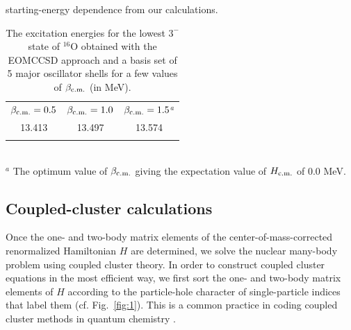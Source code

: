 \documentclass[epj]{svjour}
\begin{document}
starting-energy dependence from our calculations.
%
\begin{table}
\caption{The excitation energies for
the lowest $3^{-}$ state of $^{16}$O obtained with
the EOMCCSD approach and a basis set of 5 major oscillator shells
for a few values of $\beta_{\rm c.m.}$ (in MeV).}
\label{table:1}
\begin{tabular}{ccc}
\hline\noalign{\smallskip}
$\beta_{\rm c.m.}=0.5$ & $\beta_{\rm c.m.}=1.0$ & $\beta_{\rm c.m.}=1.5$$^{a}$ \\
\noalign{\smallskip}\hline\noalign{\smallskip}
13.413 & 13.497 & 13.574 \\
\noalign{\smallskip}\hline
\end{tabular}
\\ [1mm]
$^{a}$ The optimum value of $\beta_{\rm c.m.}$ giving
the expectation value of $H_{\rm c.m.}$ of 0.0 MeV.
\end{table}

\subsection{Coupled-cluster calculations}
\label{section:2.2}
Once the one- and two-body matrix elements of the
center-of-mass-corrected renormalized Hamiltonian
$H$ are determined, we solve the nuclear many-body problem
using coupled cluster theory. In order to
construct coupled cluster equations in the most
efficient way, we first sort the one- and two-body matrix elements of
$H$ according to the particle-hole character of
single-particle indices that label them
(cf.
Fig.~\ref{fig:1}). This is a common practice in
coding coupled cluster methods in quantum chemistry \cite{cpc}.
\end{document}
